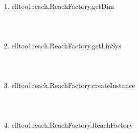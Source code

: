 \begin{enumerate}
\begin{lstlisting}
\end{lstlisting}
\fontfamily{\familydefault}
\selectfont
\item {elltool.reach.ReachFactory.getDim}
\selectfont
\begin{lstlisting}



\end{lstlisting}
\fontfamily{\familydefault}
\selectfont
\item {elltool.reach.ReachFactory.getLinSys}
\selectfont
\begin{lstlisting}



\end{lstlisting}
\fontfamily{\familydefault}
\selectfont
\item {elltool.reach.ReachFactory.createInstance}
\selectfont
\begin{lstlisting}



\end{lstlisting}
\fontfamily{\familydefault}
\selectfont
\item {elltool.reach.ReachFactory.ReachFactory}
\selectfont
\begin{lstlisting}



\end{lstlisting}
\fontfamily{\familydefault}
\selectfont
\end{enumerate}
